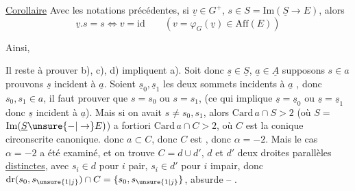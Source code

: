 \uline{Corollaire} Avec les notations précédentes, si
$\underline v\in G^+$, $s\in S=\mathrm{Im}(\underline S\to E)$, alors
\[
\underline v.s=s\Longleftrightarrow v=\mathrm{id}\qquad (v=\varphi_G(\underline v)\in\mathrm{Aff}(E))
\]

\deleted{[\unsure{Mais} b) signifie que $\underline v s_{\unsure{0}}=s_{\unsure{0}}$ implique $\underline v\underline s_0=\underline s_0$]}
Ainsi,


Il reste à prouver b), c), d) impliquent a).
Soit donc $\underline s\in\underline S$, $\underline a\in\underline A$ supposons $s\in a$
prouvons $\underline s$ incident à $\underline a$. Soient $\underline s_0,\underline s_1$ les
deux sommets  incidents à $\underline a$ , donc $s_0,s_1\in a$,
 il faut prouver que  $s=s_0$ ou $s=s_1$,
(ce qui implique $\underline s=\underline s_0$ ou $\underline s=\underline s_1$ donc
$\underline s$ incident à $\underline a$).  Mais si on avait
$s\ne s_0,s_1$, alors $\mathrm{Card}\,a\cap S>2$ (où $S=$
$\mathrm{Im}(\underline S\unsure{-|\to}E)$) a fortiori $\mathrm{Card}\,a\cap C>2$,
où $C$ est la conique circonscrite canonique.
donc $a\subset C$, donc $C$ est  , donc
$\alpha=-2$. Mais le cas $\alpha=-2$ a été examiné,
et on trouve $C=d\cup d'$, $d$ et $d'$ deux
droites parallèles \uline{distinctes}, avec $s_i\in d$
pour $i$ pair, $s_i\in d'$ pour $i$ impair, donc
$\mathrm{dr}(s_0,s_{\unsure{1|j}})\cap C=\{s_0,s_{\unsure{1|j}}\}$, absurde -- .
